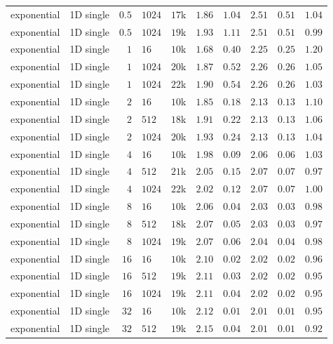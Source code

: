 {\begin{longtable}{llrlrrrrrr}
    exponential & 1D single & $0.5$ & $1024$ & $17$k & $1.86$ & $1.04$ & $2.51$ & $0.51$ & $1.04$ \\
    exponential & 1D single & $0.5$ & $1024$ & $19$k & $1.93$ & $1.11$ & $2.51$ & $0.51$ & $0.99$ \\
    exponential & 1D single & $1$ & $16$ & $10$k & $1.68$ & $0.40$ & $2.25$ & $0.25$ & $1.20$ \\
    exponential & 1D single & $1$ & $1024$ & $20$k & $1.87$ & $0.52$ & $2.26$ & $0.26$ & $1.05$ \\
    exponential & 1D single & $1$ & $1024$ & $22$k & $1.90$ & $0.54$ & $2.26$ & $0.26$ & $1.03$ \\
    exponential & 1D single & $2$ & $16$ & $10$k & $1.85$ & $0.18$ & $2.13$ & $0.13$ & $1.10$ \\
    exponential & 1D single & $2$ & $512$ & $18$k & $1.91$ & $0.22$ & $2.13$ & $0.13$ & $1.06$ \\
    exponential & 1D single & $2$ & $1024$ & $20$k & $1.93$ & $0.24$ & $2.13$ & $0.13$ & $1.04$ \\
    exponential & 1D single & $4$ & $16$ & $10$k & $1.98$ & $0.09$ & $2.06$ & $0.06$ & $1.03$ \\
    exponential & 1D single & $4$ & $512$ & $21$k & $2.05$ & $0.15$ & $2.07$ & $0.07$ & $0.97$ \\
    exponential & 1D single & $4$ & $1024$ & $22$k & $2.02$ & $0.12$ & $2.07$ & $0.07$ & $1.00$ \\
    exponential & 1D single & $8$ & $16$ & $10$k & $2.06$ & $0.04$ & $2.03$ & $0.03$ & $0.98$ \\
    exponential & 1D single & $8$ & $512$ & $18$k & $2.07$ & $0.05$ & $2.03$ & $0.03$ & $0.97$ \\
    exponential & 1D single & $8$ & $1024$ & $19$k & $2.07$ & $0.06$ & $2.04$ & $0.04$ & $0.98$ \\
    exponential & 1D single & $16$ & $16$ & $10$k & $2.10$ & $0.02$ & $2.02$ & $0.02$ & $0.96$ \\
    exponential & 1D single & $16$ & $512$ & $19$k & $2.11$ & $0.03$ & $2.02$ & $0.02$ & $0.95$ \\
    exponential & 1D single & $16$ & $1024$ & $19$k & $2.11$ & $0.04$ & $2.02$ & $0.02$ & $0.95$ \\
    exponential & 1D single & $32$ & $16$ & $10$k & $2.12$ & $0.01$ & $2.01$ & $0.01$ & $0.95$ \\
    exponential & 1D single & $32$ & $512$ & $19$k & $2.15$ & $0.04$ & $2.01$ & $0.01$ & $0.92$ \\

\end{longtable}}

